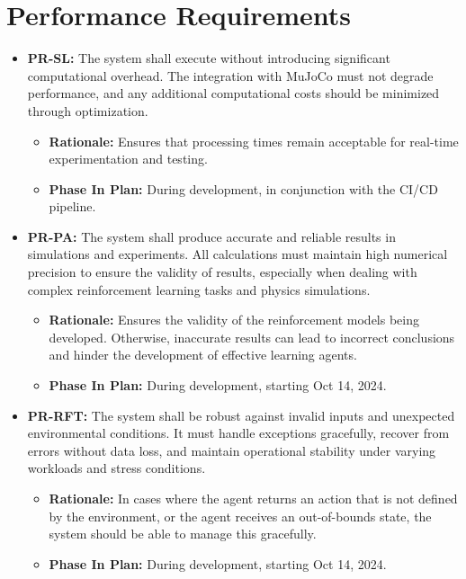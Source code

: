 \documentclass[12pt]{article}
\begin{document}
\section{Performance Requirements}
\begin{itemize}
\item \label{PR-SL} \textbf{PR-SL:} The system shall execute without introducing significant computational overhead. The integration with MuJoCo must not degrade performance, and any additional computational costs should be minimized through optimization.
  \begin{itemize}
    \item \textbf{Rationale:} Ensures that processing times remain acceptable for real-time experimentation and testing.
    \item \textbf{Phase In Plan:} During development, in conjunction with the CI/CD pipeline.
  \end{itemize}

\item \label{PR-PA} \textbf{PR-PA:} The system shall produce accurate and reliable results in simulations and experiments. All calculations must maintain high numerical precision to ensure the validity of results, especially when dealing with complex reinforcement learning tasks and physics simulations.
  \begin{itemize}
    \item \textbf{Rationale:} Ensures the validity of the reinforcement models being developed. Otherwise, inaccurate results can lead to incorrect conclusions and hinder the development of effective learning agents.
    \item \textbf{Phase In Plan:} During development, starting Oct 14, 2024.
  \end{itemize}

\item \label{PR-RFT} \textbf{PR-RFT:} The system shall be robust against invalid inputs and unexpected environmental conditions. It must handle exceptions gracefully, recover from errors without data loss, and maintain operational stability under varying workloads and stress conditions.
  \begin{itemize}
    \item \textbf{Rationale:} In cases where the agent returns an action that is not defined by the environment, or the agent receives an out-of-bounds state, the system should be able to manage this gracefully.
    \item \textbf{Phase In Plan:} During development, starting Oct 14, 2024.
  \end{itemize}


\end{itemize}
\end{document}
